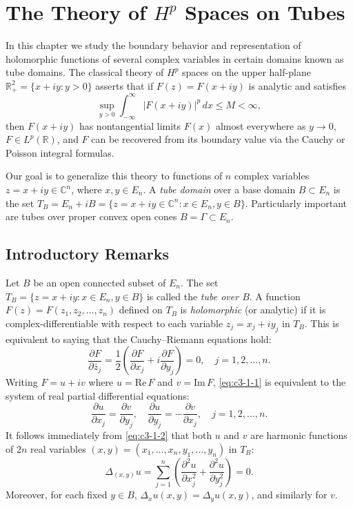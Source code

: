 \chapter{The Theory of \texorpdfstring{$H^{p}$}{Hp} Spaces on Tubes}
\label{ch:hp-tubes}

In this chapter we study the boundary behavior and representation of holomorphic functions of several complex variables in certain domains known as tube domains. The classical theory of $H^p$ spaces on the upper half-plane $\mathbb{R}_+^2 = \{x + iy : y > 0\}$ asserts that if $F(z) = F(x + iy)$ is analytic and satisfies
\[
\sup_{y > 0} \int_{-\infty}^\infty |F(x + iy)|^p\,dx \leq M < \infty,
\]
then $F(x + iy)$ has nontangential limits $F(x)$ almost everywhere as $y \to 0$, $F \in L^p(\mathbb{R})$, and $F$ can be recovered from its boundary value via the Cauchy or Poisson integral formulas.

Our goal is to generalize this theory to functions of $n$ complex variables $z = x + iy \in \mathbb{C}^n$, where $x, y \in E_n$. A \emph{tube domain} over a base domain $B \subset E_n$ is the set $T_B = E_n + i B = \{z = x + iy \in \mathbb{C}^n : x \in E_n, y \in B\}$. Particularly important are tubes over proper convex open cones $B = \Gamma \subset E_n$.

\section{Introductory Remarks}

Let $B$ be an open connected subset of $E_n$. The set $T_B = \{z = x + iy : x \in E_n, y \in B\}$ is called the \emph{tube over $B$}. A function $F(z) = F(z_1, z_2, \dots, z_n)$ defined on $T_B$ is \emph{holomorphic} (or analytic) if it is complex-differentiable with respect to each variable $z_j = x_j + i y_j$ in $T_B$. This is equivalent to saying that the Cauchy--Riemann equations hold:
\begin{equation}\label{eq:c3-1-1}
\frac{\partial F}{\partial \bar{z}_j} = \frac{1}{2} \left( \frac{\partial F}{\partial x_j} + i \frac{\partial F}{\partial y_j} \right) = 0, \quad j = 1, 2, \dots, n.
\end{equation}
Writing $F = u + iv$ where $u = \text{Re}\,F$ and $v = \text{Im}\,F$, \eqref{eq:c3-1-1} is equivalent to the system of real partial differential equations:
\begin{equation}\label{eq:c3-1-2}
\frac{\partial u}{\partial x_j} = \frac{\partial v}{\partial y_j}, \quad \frac{\partial u}{\partial y_j} = -\frac{\partial v}{\partial x_j}, \quad j = 1, 2, \dots, n.
\end{equation}
It follows immediately from \eqref{eq:c3-1-2} that both $u$ and $v$ are harmonic functions of $2n$ real variables $(x, y) = (x_1, \dots, x_n, y_1, \dots, y_n)$ in $T_B$:
\begin{equation}\label{eq:c3-1-3}
\Delta_{(x,y)} u = \sum_{j=1}^n \left( \frac{\partial^2 u}{\partial x_j^2} + \frac{\partial^2 u}{\partial y_j^2} \right) = 0.
\end{equation}
Moreover, for each fixed $y \in B$, $\Delta_x u(x, y) = \Delta_y u(x, y)$, and similarly for $v$.

